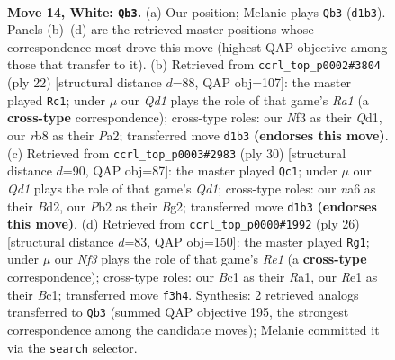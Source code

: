 \documentclass[11pt]{article}
\begin{document}
\clearpage

\begin{figure}[p]\centering
\begin{subfigure}{0.46\textwidth}\centering
\resizebox{\linewidth}{!}{%
\newchessgame
\chessboard[
  setfen={1rbq1r1k/pp5p/n1pb2p1/3p1p1n/3P1P2/P4NP1/1P1NP1BP/R1BQR1K1 w - - 1 14},
  showmover=false,
  pgfstyle=straightmove, color=movearrow, markmove={d1-b3}
]}
\caption{}
\end{subfigure}\hfill
\begin{subfigure}{0.46\textwidth}\centering
\resizebox{\linewidth}{!}{%
\newchessgame
\chessboard[
  setfen={r1bq1rk1/pp1nbpp1/2n1p3/3pP2p/3P3P/2N1BPP1/PP2N3/R2QKB1R w KQ - 1 12},
  showmover=false,
  pgfstyle=straightmove, color=movearrow, markmove={a1-c1}
]}
\caption{}
\end{subfigure}
\\[4pt]
\begin{subfigure}{0.46\textwidth}\centering
\resizebox{\linewidth}{!}{%
\newchessgame
\chessboard[
  setfen={2bq1rk1/1r3pb1/pp1p1npp/n1pP4/P1P5/RPN2NPP/3B1PB1/3Q1RK1 w - - 2 16},
  showmover=false,
  pgfstyle=straightmove, color=movearrow, markmove={d1-c1}
]}
\caption{}
\end{subfigure}\hfill
\begin{subfigure}{0.46\textwidth}\centering
\resizebox{\linewidth}{!}{%
\newchessgame
\chessboard[
  setfen={r1bq1r1k/1p1nb1pp/p1n1p3/3pPp2/1P1P4/P2B1N2/3N1PPP/R1BQR2K w - - 2 14},
  showmover=false,
  pgfstyle=straightmove, color=movearrow, markmove={e1-g1}
]}
\caption{}
\end{subfigure}
\caption{\textbf{Move 14, White: \texttt{Qb3}.} (a) Our position; Melanie plays \texttt{Qb3} (\texttt{d1b3}). Panels (b)--(d) are the retrieved master positions whose correspondence most drove this move (highest QAP objective among those that transfer to it). (b) Retrieved from \texttt{ccrl\_top\_p0002\#3804} (ply 22) [structural distance $d$=88, QAP obj=107]: the master played \texttt{Rc1}; under $\mu$ our \emph{Qd1} plays the role of that game's \emph{Ra1} (a \textbf{cross-type} correspondence); cross-type roles: our \emph{N}f3 as their \emph{Q}d1, our \emph{r}b8 as their \emph{P}a2; transferred move \texttt{d1b3} \textbf{(endorses this move)}. (c) Retrieved from \texttt{ccrl\_top\_p0003\#2983} (ply 30) [structural distance $d$=90, QAP obj=87]: the master played \texttt{Qc1}; under $\mu$ our \emph{Qd1} plays the role of that game's \emph{Qd1}; cross-type roles: our \emph{n}a6 as their \emph{B}d2, our \emph{P}b2 as their \emph{B}g2; transferred move \texttt{d1b3} \textbf{(endorses this move)}. (d) Retrieved from \texttt{ccrl\_top\_p0000\#1992} (ply 26) [structural distance $d$=83, QAP obj=150]: the master played \texttt{Rg1}; under $\mu$ our \emph{Nf3} plays the role of that game's \emph{Re1} (a \textbf{cross-type} correspondence); cross-type roles: our \emph{B}c1 as their \emph{R}a1, our \emph{R}e1 as their \emph{B}c1; transferred move \texttt{f3h4}. Synthesis: 2 retrieved analogs transferred to \texttt{Qb3} (summed QAP objective 195, the strongest correspondence among the candidate moves); Melanie committed it via the \texttt{search} selector.}
\label{fig:thought-m26}
\end{figure}
\end{document}
